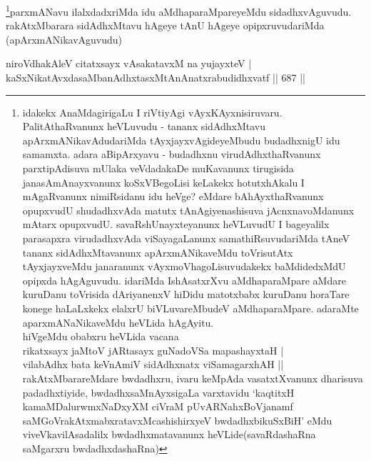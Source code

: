 \begin{artha}
\footnote{idakekx AnaMdagirigaLu I riVtiyAgi vAyxKAyxnisiruvaru. PalitAthaRvanunx heVLuvudu - tananx sidAdhxMtavu apArxmANikavAdudariMda tAyxjayxvAgideyeMbudu budadhxnigU idu samamxta. adara aBipArxyavu - budadhxnu virudAdhxthaRvanunx parxtipAdisuva mUlaka veVdadakaDe muKavanunx tirugisida janasAmAnayxvanunx koSxVBegoLisi keLakekx hotutxhAkalu I mAgaRvanunx nimiRsidanu idu heVge? eMdare bAhAyxthaRvanunx opupxvudU shudadhxvAda matutx tAnAgiyenashisuva jAcnxnavoMdanunx mAtarx opupxvudU. savaRshUnayxteyanunx heVLuvudU I bageyalilx parasapxra virudadhxvAda viSayagaLanunx samathiRsuvudariMda tAneV tananx sidAdhxMtavanunx apArxmANikaveMdu toVrisutAtx tAyxjayxveMdu janaranunx vAyxmoVhagoLisuvudakekx baMdidedxMdU opipxda hAgAguvudu. idariMda IshAsatxrXvu aMdhaparaMpare aMdare kuruDanu toVrisida dAriyanenxV hiDidu matotxbabx kuruDanu horaTare konege haLaLxkekx elalxrU biVLuvareMbudeV aMdhaparaMpare. adaraMte aparxmANaNikaveMdu heVLida hAgAyitu.\\
hiVgeMdu obabxru heVLida vacana\\
rikatxsayx jaMtoV jARtasayx guNadoVSa mapashayxtaH |\\
vilabAdhx bata keVnAmiV sidAdhxnatx viSamagarxhAH ||\\
rakAtxMbarareMdare bwdadhxru, ivaru keMpAda vasatxtXvanunx dharisuva padadhxtiyide, bwdadhxsaMnAyxsigaLa varxtavidu `kaqtitxH kamaMDalurwmxNaDxyXM ciVraM pUvARNahxBoVjanamf saMGoVrakAtxmabxratavxMcashishirxyeV bwdadhxbikuSxBiH' eMdu viveVkavilAsadalilx bwdadhxmatavanunx heVLide(savaRdashaRna saMgarxru bwdadhxdashaRna)}parxmANavu ilalxdadxriMda idu  aMdhaparaMpareyeMdu sidadhxvAguvudu. rakAtxMbarara sidAdhxMtavu hAgeye tAnU hAgeye opipxruvudariMda (apArxmANikavAguvudu)
\end{artha}


\begin{shl}
\footnotemark[1]niroVdhakAleV citatxsayx vAsakatavxM na yujayxteV | \\
kaSxNikatAvxdasaMbanAdhxtasxMtAnAnatxrabudidhxvatf \hfill||  687 ||  
\end{shl}

